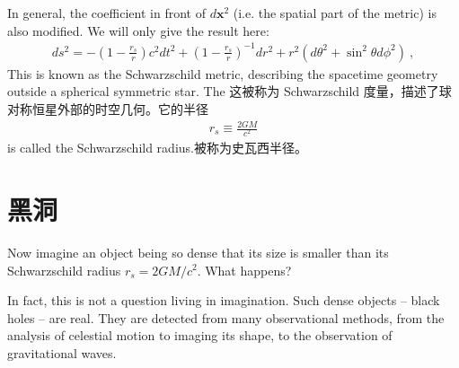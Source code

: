 {{      }
      In general, the coefficient in front of $d \mathbf{x}^2$ (i.e. the spatial part of the metric) is also modified. We will only give the result here: 
      \begin{align}
        \label{eq:schwarzschild}
        ds^2 = - \left ( 1 - \frac{r_s}{r}  \right ) c^2 dt^2
        + \left ( 1 - \frac{r_s}{r}  \right )^{-1} dr^2
        + r^2 \left ( d\theta^2 + \sin^2\theta d\phi^2 \right )~,
      \end{align}
      This is known as the Schwarzschild metric, describing the spacetime geometry outside a spherical symmetric star. The 这被称为 Schwarzschild 度量，描述了球对称恒星外部的时空几何。它的半径
      \begin{align}
        \label{eq:rs}
        r_s \equiv \frac{2GM}{c^2} 
      \end{align}
      is called the Schwarzschild radius.被称为史瓦西半径。
}


\section{黑洞}

Now imagine an object being so dense that its size is smaller than its Schwarzschild radius $r_s = 2GM/c^2$. What happens?

In fact, this is not a question living in imagination. Such dense objects -- black holes -- are real. They are detected from many observational methods, from the analysis of celestial motion to imaging its shape, to the observation of gravitational waves.

